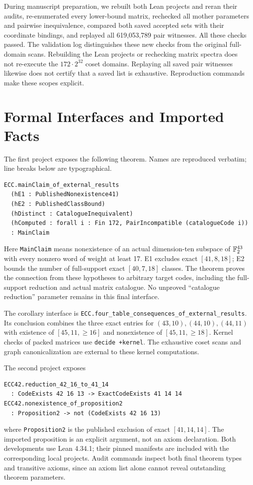 During manuscript preparation, we rebuilt both Lean projects and reran their audits, re-enumerated every lower-bound matrix, rechecked all mother parameters and pairwise inequivalence, compared both saved accepted sets with their coordinate bindings, and replayed all 619,053,789 pair witnesses. All these checks passed. The validation log distinguishes these new checks from the original full-domain scans. Rebuilding the Lean projects or rechecking matrix spectra does not re-execute the $172\cdot2^{32}$ coset domains. Replaying all saved pair witnesses likewise does not certify that a saved list is exhaustive. Reproduction commands make these scopes explicit.

\section{Formal Interfaces and Imported Facts}
\label{app:formal}
The first project exposes the following theorem. Names are reproduced verbatim; line breaks below are typographical.
\begin{lstlisting}[basicstyle=\ttfamily\small,breaklines=true]
ECC.mainClaim_of_external_results
  (hE1 : PublishedNonexistence41)
  (hE2 : PublishedClassBound)
  (hDistinct : CatalogueInequivalent)
  (hComputed : forall i : Fin 172, PairIncompatible (catalogueCode i))
  : MainClaim
\end{lstlisting}
Here \texttt{MainClaim} means nonexistence of an actual dimension-ten subspace of $\mathbb F_2^{43}$ with every nonzero word of weight at least 17. E1 excludes exact $[41,8,18]$; E2 bounds the number of full-support exact $[40,7,18]$ classes. The theorem proves the connection from these hypotheses to arbitrary target codes, including the full-support reduction and actual matrix catalogue. No unproved ``catalogue reduction'' parameter remains in this final interface.

The corollary interface is \texttt{ECC.four\_table\_consequences\_of\_external\_results}. Its conclusion combines the three exact entries for $(43,10),(44,10),(44,11)$ with existence of $[45,11,\ge16]$ and nonexistence of $[45,11,\ge18]$. Kernel checks of packed matrices use \texttt{decide +kernel}. The exhaustive coset scans and graph canonicalization are external to these kernel computations.

The second project exposes
\begin{lstlisting}[basicstyle=\ttfamily\small,breaklines=true]
ECC42.reduction_42_16_to_41_14
  : CodeExists 42 16 13 -> ExactCodeExists 41 14 14
ECC42.nonexistence_of_proposition2
  : Proposition2 -> not (CodeExists 42 16 13)
\end{lstlisting}
where \texttt{Proposition2} is the published exclusion of exact $[41,14,14]$. The imported proposition is an explicit argument, not an axiom declaration. Both developments use Lean 4.34.1; their pinned manifests are included with the corresponding local projects. Audit commands inspect both final theorem types and transitive axioms, since an axiom list alone cannot reveal outstanding theorem parameters.

